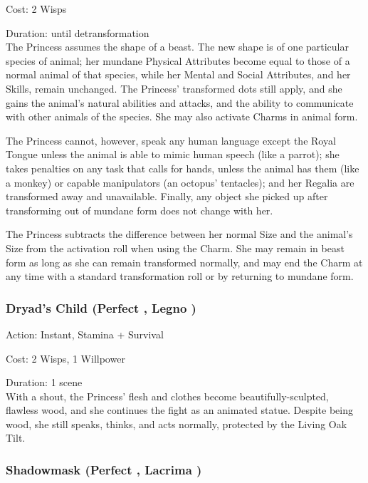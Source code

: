 \noindent Cost: 2 Wisps

\noindent Duration: until detransformation \\

\noindent The Princess assumes the shape of a beast. The new shape is of one particular species of animal; her mundane Physical Attributes become equal to those of a normal animal of that species, while her Mental and Social Attributes, and her Skills, remain unchanged. The Princess' transformed dots still apply, and she gains the animal's natural abilities and attacks, and the ability to communicate with other animals of the species. She may also activate Charms in animal form.

The Princess cannot, however, speak any human language except the Royal Tongue unless the animal is able to mimic human speech (like a parrot); she takes penalties on any task that calls for hands, unless the animal has them (like a monkey) or capable manipulators (an octopus' tentacles); and her Regalia are transformed away and unavailable. Finally, any object she picked up after transforming out of mundane form does not change with her.

The Princess subtracts the difference between her normal Size and the animal's Size from the activation roll when using the Charm. She may remain in beast form as long as she can remain transformed normally, and may end the Charm at any time with a standard transformation roll or by returning to mundane form.

\subsubsection*{Dryad's Child (Perfect \textbullet\textbullet\textbullet\textbullet\textbullet, Legno \textbullet\textbullet\textbullet\textbullet)}

\noindent Action: Instant, Stamina + Survival

\noindent Cost: 2 Wisps, 1 Willpower

\noindent Duration: 1 scene \\

\noindent  With a shout, the Princess' flesh and clothes become beautifully-sculpted, flawless wood, and she continues the fight as an animated statue. Despite being wood, she still speaks, thinks, and acts normally, protected by the Living Oak Tilt.

\subsubsection*{Shadowmask (Perfect \textbullet\textbullet\textbullet\textbullet\textbullet, Lacrima \textbullet\textbullet\textbullet)}

